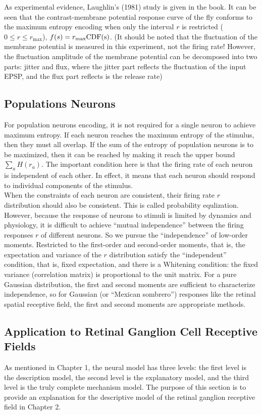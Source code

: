   As experimental evidence, Laughlin's (1981) study is given in the
  book. It can be seen that the contrast-membrane potential
  response curve of the fly conforms to the maximum
  entropy encoding when only the interval $r$ is restricted ($0\leq
  r\leq r_{\max}$), $f(s)=r_{\max}\rm{CDF}(s)$. (It should be noted that
  the fluctuation of the membrane potential is measured in this
  experiment, not the firing rate! However, the fluctuation amplitude
  of the membrane potential can be decomposed into two parts: jitter
  and flux, where the jitter part reflects the fluctuation of the
  input EPSP, and the flux part reflects is the release rate)
  \subsection{Populations Neurons}
  For population neurons encoding, it is not required for a single
  neuron to achieve maximum entropy. If each neuron reaches the
  maximum entropy of the stimulus, then they must all overlap. If the
  sum of the entropy of population neurons is to be maximized, then it
  can be reached by making it reach the upper bound
  $\sum\limits_aH(r_a)$.  The important condition here is that the
  firing rate of each neuron is independent of each other. In effect,
  it means that each neuron should respond to individual components of
  the stimulus.\\
  
 When the constraints of each neuron are consistent, their firing rate
 $r$ distribution should also be consistent. This is called
 probability equlization. However, because the response of neurons to
 stimuli is limited by dynamics and physiology, it is difficult to
 achieve ``mutual independence'' between the firing responses $r$ of
 different neurons. So we pursue the ``independence'' of low-order
 moments. Restricted to the first-order and second-order moments, that
 is, the expectation and variance of the $r$ distribution satisfy the
 ``independent'' condition, that is, fixed expectation, and there is a
 Whitening condition: the fixed variance (correlation matrix) is
 proportional to the unit matrix. For a pure Gaussian distribution,
 the first and second moments are sufficient to characterize
 independence, so for Gaussian (or ``Mexican sombrero'') responses like
 the retinal spatial receptive field, the first and second moments are
 appropriate methods.\\
 \subsection{Application to Retinal Ganglion Cell Receptive Fields}
As mentioned in Chapter 1, the neural model has three levels: the
first level is the description model, the second level is the
explanatory model, and the third level is the truly complete mechanism
model. The purpose of this section is to provide an explanation for
the descriptive model of the retinal ganglion receptive field in
Chapter 2.\\

